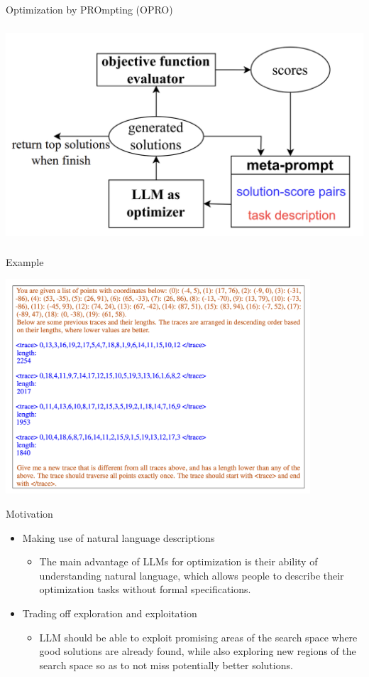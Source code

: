 \documentclass[aspectratio=1610,xcolor={dvipsnames},hyperref={colorlinks,unicode,linkcolor=violet,anchorcolor=BlueViolet,citecolor=YellowOrange,filecolor=black,urlcolor=Aquamarine}]{beamer}
\begin{document}
\begin{frame}[label={sec:org7974b56}]{Optimization by PROmpting (OPRO)}
\begin{center}
\includegraphics[height=8cm]{./p1.png}
\end{center}
\end{frame}
\begin{frame}[label={sec:org830f28f}]{Example}
\begin{center}
\includegraphics[height=8cm]{./p2.png}
\end{center}
\end{frame}
\begin{frame}[label={sec:orgf74c630}]{Motivation}
\begin{itemize}
\item Making use of natural language descriptions
\begin{itemize}
\item The main advantage of LLMs for optimization is their ability of understanding natural language, which allows people to describe their optimization tasks without formal specifications.
\end{itemize}
\item Trading off exploration and exploitation
\begin{itemize}
\item LLM should be able to exploit promising areas of the search space where good solutions are already found, while also exploring new regions of the search space so as to not miss potentially better solutions.
\end{itemize}
\end{itemize}
\end{frame}
\end{document}
